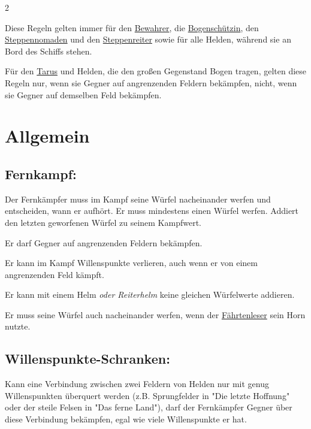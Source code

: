 \documentclass[10pt, a4paper, oneside]{book}
\newcommand{\fan}[1]{\textit{#1}}
\begin{document}
\begin{multicols*}{2}\raggedcolumns


\begin{nobgcolor}
Diese Regeln gelten immer für den \hyperref[Bewahrer]{Bewahrer}, die \hyperref[Bogenschützin]{Bogenschützin}, den \hyperref[Steppennomade]{Steppennomaden} und den \hyperref[Steppenreiter]{Steppenreiter} sowie für alle Helden, während sie an Bord des Schiffs stehen.

Für den \hyperref[Tarus]{Tarus} und Helden, die den großen Gegenstand Bogen tragen, gelten diese Regeln nur, wenn sie Gegner auf angrenzenden Feldern bekämpfen, nicht, wenn sie Gegner auf demselben Feld bekämpfen.


\section{Allgemein}



\subsection{Fernkampf:}

Der Fernkämpfer muss im Kampf seine Würfel nacheinander werfen und entscheiden, wann er aufhört. Er muss mindestens einen Würfel werfen. Addiert den letzten geworfenen Würfel zu seinem Kampfwert.

Er darf Gegner auf angrenzenden Feldern bekämpfen.

Er kann im Kampf Willenspunkte verlieren, auch wenn er von einem angrenzenden Feld kämpft.

Er kann mit einem Helm \fan{oder Reiterhelm} keine gleichen Würfelwerte addieren.
\supercite{DLvA:Begleitheft}

Er muss seine Würfel auch nacheinander werfen, wenn der \hyperref[Fährtenleser]{Fährtenleser} sein Horn nutzte.
\supercite{NH:Begleitheft}



\subsection{Willenspunkte-Schranken:}

Kann eine Verbindung zwischen zwei Feldern von Helden nur mit genug Willenspunkten überquert werden (z.B. Sprungfelder in "Die letzte Hoffnung"\supercite{DlH:Begleitheft,DlH11:b} oder der steile Felsen in "Das ferne Land"), darf der Fernkämpfer Gegner über diese Verbindung bekämpfen, egal wie viele Willenspunkte er hat.





\end{nobgcolor}
\end{multicols*}
\end{document}
